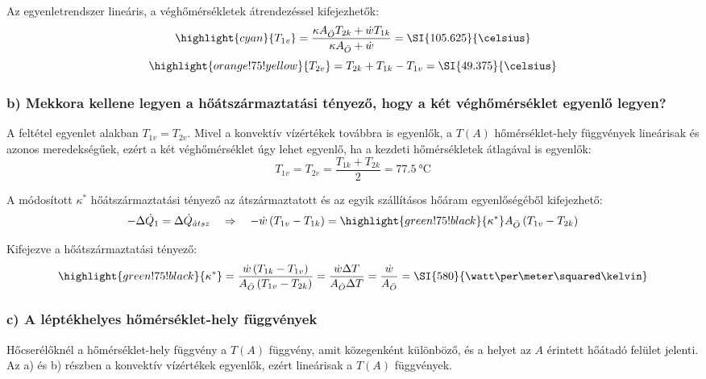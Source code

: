 Az egyenletrendszer lineáris, a véghőmérsékletek átrendezéssel kifejezhetők:
\begin{equation}
	\highlight{cyan}{T_{1v}} = \frac{\kappa A_{\ddot{O}} T_{2k} + \dot{w} T_{1k}}{\kappa A_{\ddot{O}} + \dot{w}} = \SI{105.625}{\celsius}
\end{equation}
\begin{equation}
	\highlight{orange!75!yellow}{T_{2v}} = T_{2k} + T_{1k} - T_{1v} = \SI{49.375}{\celsius}
\end{equation}

\subsubsection*{b) Mekkora kellene legyen a hőátszármaztatási tényező, hogy a két véghőmérséklet egyenlő legyen?}
A feltétel egyenlet alakban $T_{1v} = T_{2v}$. Mivel a konvektív vízértékek továbbra is egyenlők, a $T\left(A\right)$ hőmérséklet-hely függvények lineárisak és azonos meredekségűek, ezért a két véghőmérséklet úgy lehet egyenlő, ha a kezdeti hőmérsékletek átlagával is egyenlők:
\begin{equation}
	T_{1v} = T_{2v} = \dfrac{T_{1k} + T_{2k}}{2} = \SI{77.5}{\celsius}
\end{equation}

A módosított $\kappa^*$ hőátszármaztatási tényező az átszármaztatott és az egyik szállításos hőáram egyenlőségéből kifejezhető:
\begin{equation}
	-\Delta \dot{Q}_1 = \Delta \dot{Q}_{\acute{a}tsz}
	\quad \Rightarrow \quad 
	-\dot{w} \left(T_{1v} - T_{1k}\right) 
	= 
	\highlight{green!75!black}{\kappa^*} A_{\ddot{O}} \left(T_{1v} - T_{2k}\right)
\end{equation}

Kifejezve a hőátszármaztatási tényező:
\begin{equation}
	\highlight{green!75!black}{\kappa^*} 
	= 
	\dfrac{\dot{w} \left(T_{1k} - T_{1v}\right)}{A_{\ddot{O}} \left(T_{1v} - T_{2k}\right)} 
	= 
	\dfrac{\dot{w} \Delta T}{A_{\ddot{O}} \Delta T} 
	= 
	\dfrac{\dot{w}}{A_{\ddot{O}}} = \SI{580}{\watt\per\meter\squared\kelvin}
\end{equation}

\subsubsection*{c) A léptékhelyes hőmérséklet-hely függvények}
Hőcserélőknél a hőmérséklet-hely függvény a $T\!\left(A\right)$ függvény, amit közegenként különböző, és a helyet az $A$ érintett hőátadó felület jelenti. Az a) és b) részben a konvektív vízértékek egyenlők, ezért lineárisak a $T\!\left(A\right)$ függvények.

